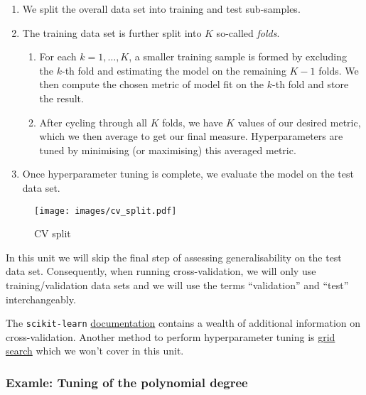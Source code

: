 \documentclass{scrartcl}
\providecommand{\tightlist}{%
      \setlength{\itemsep}{0pt}\setlength{\parskip}{0pt}}
\begin{document}
\begin{enumerate}
\def\labelenumi{\arabic{enumi}.}
\tightlist
\item
  We split the overall data set into training and test sub-samples.
\item
  The training data set is further split into \(K\) so-called
  \emph{folds}.

  \begin{enumerate}
  \def\labelenumii{\arabic{enumii}.}
  \tightlist
  \item
    For each \(k = 1,\dots,K\), a smaller training sample is formed by
    excluding the \(k\)-th fold and estimating the model on the
    remaining \(K-1\) folds. We then compute the chosen metric of model
    fit on the \(k\)-th fold and store the result.
  \item
    After cycling through all \(K\) folds, we have \(K\) values of our
    desired metric, which we then average to get our final measure.
    Hyperparameters are tuned by minimising (or maximising) this
    averaged metric.
  \end{enumerate}
\item
  Once hyperparameter tuning is complete, we evaluate the model on the
  test data set.
\end{enumerate}

    \begin{figure}
\centering
\begin{adjustbox}{max totalheight=0.4\textheight}
\texttt{[image: images/cv\_split.pdf]}
\end{adjustbox}
\caption{CV split}
\end{figure}

    In this unit we will skip the final step of assessing generalisability
on the test data set. Consequently, when running cross-validation, we
will only use training/validation data sets and we will use the terms
``validation'' and ``test'' interchangeably.

The \texttt{scikit-learn}
\href{https://scikit-learn.org/stable/modules/cross_validation.html}{documentation}
contains a wealth of additional information on cross-validation. Another
method to perform hyperparameter tuning is
\href{https://scikit-learn.org/stable/modules/grid_search.html}{grid
search} which we won't cover in this unit.

    \hypertarget{examle-tuning-of-the-polynomial-degree}{%
\subsubsection{Examle: Tuning of the polynomial
degree}\label{examle-tuning-of-the-polynomial-degree}}
\end{document}
